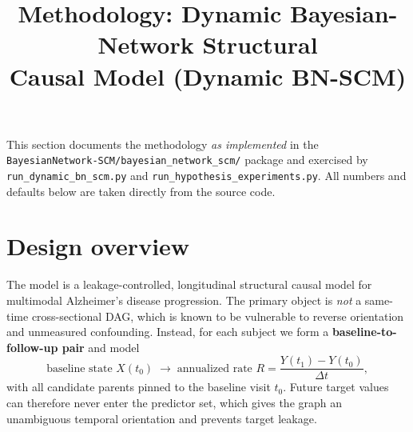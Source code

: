 \documentclass[11pt]{article}
\title{Methodology: Dynamic Bayesian-Network Structural\\ Causal Model (Dynamic BN-SCM)}
\author{}
\date{}
\newcommand{\code}[1]{\texttt{#1}}
\begin{document}
\maketitle

\noindent
This section documents the methodology \emph{as implemented} in the
\code{BayesianNetwork-SCM/bayesian\_network\_scm/} package and exercised by
\code{run\_dynamic\_bn\_scm.py} and \code{run\_hypothesis\_experiments.py}.
All numbers and defaults below are taken directly from the source code.

\section{Design overview}

The model is a leakage-controlled, longitudinal structural causal model for
multimodal Alzheimer's disease progression. The primary object is \emph{not}
a same-time cross-sectional DAG, which is known to be vulnerable to reverse
orientation and unmeasured confounding. Instead, for each subject we form a
\textbf{baseline-to-follow-up pair} and model
\[
\text{baseline state } X(t_0) \;\longrightarrow\; \text{annualized rate } R = \frac{Y(t_1) - Y(t_0)}{\Delta t},
\]
with all candidate parents pinned to the baseline visit $t_0$. Future target
values can therefore never enter the predictor set, which gives the graph
an unambiguous temporal orientation and prevents target leakage.
\end{document}

